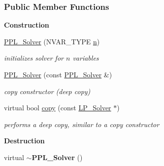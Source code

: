 \subsubsection*{Public Member Functions}
\begin{Indent}\textbf{ Construction}\par
\begin{DoxyCompactItemize}
\item 
\mbox{\label{group___c_l_s_solvers_a8676ceed54fc8883fd0c2cab45e7d9a4}} 
\hyperlink{group___c_l_s_solvers_a8676ceed54fc8883fd0c2cab45e7d9a4}{P\+P\+L\+\_\+\+Solver} (N\+V\+A\+R\+\_\+\+T\+Y\+PE \hyperlink{group___c_l_s_solvers_a10d4394603a6a565a95fc65ce0f9a172}{n})
\begin{DoxyCompactList}\small\item\em initializes solver for $ n $ variables \end{DoxyCompactList}\item 
\mbox{\label{group___c_l_s_solvers_a53d5564f046f82f07f58e557228f10c5}} 
\hyperlink{group___c_l_s_solvers_a53d5564f046f82f07f58e557228f10c5}{P\+P\+L\+\_\+\+Solver} (const \hyperlink{group___c_l_s_solvers_class_l_p___solvers_1_1_p_p_l___solver}{P\+P\+L\+\_\+\+Solver} \&)
\begin{DoxyCompactList}\small\item\em copy constructor (deep copy) \end{DoxyCompactList}\item 
virtual bool \hyperlink{group___c_l_s_solvers_aa447a576420597eb9ff86b8875f5d30c}{copy} (const \hyperlink{group___c_l_s_solvers_class_l_p___solvers_1_1_l_p___solver}{L\+P\+\_\+\+Solver} $\ast$)
\begin{DoxyCompactList}\small\item\em performs a deep copy, similar to a copy constructor \end{DoxyCompactList}\end{DoxyCompactItemize}
\end{Indent}
\begin{Indent}\textbf{ Destruction}\par
\begin{DoxyCompactItemize}
\item 
\mbox{\label{group___c_l_s_solvers_a2d4cd90b9e8bab2ff0fe3178bb894e75}} 
virtual {\bfseries $\sim$\+P\+P\+L\+\_\+\+Solver} ()
\end{DoxyCompactItemize}
\end{Indent}
